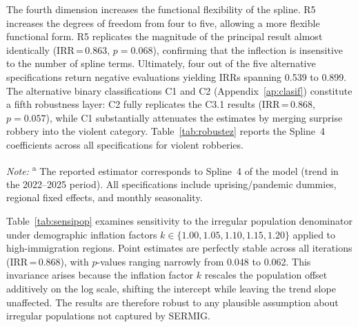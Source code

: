 \documentclass[pdflatex,sn-basic]{sn-jnl}
\newcommand{\tablenote}[1]{%
  \vspace{2pt}%
  {\par\footnotesize\textit{Note:} #1\par}%
}
\begin{document}
The fourth dimension increases the functional flexibility of the spline. R5 increases the degrees of freedom from four to five, allowing a more flexible functional form. R5 replicates the magnitude of the principal result almost identically (IRR\,=\,0.863, $p=0.068$), confirming that the inflection is insensitive to the number of spline terms. Ultimately, four out of the five alternative specifications return negative evaluations yielding IRRs spanning 0.539 to 0.899. The alternative binary classifications C1 and C2 (Appendix~\ref{ap:clasif}) constitute a fifth robustness layer: C2 fully replicates the C3.1 results (IRR\,=\,0.868, $p=0.057$), while C1 substantially attenuates the estimates by merging surprise robbery into the violent category. Table~\ref{tab:robustez} reports the Spline~4 coefficients across all specifications for violent robberies.

\begin{table}[htbp]
\centering
\caption{Robustness analysis: trend coefficient beneath alternate equivalents (violent robberies, C3.1)}
\label{tab:robustez}
\footnotesize
{}
\tablenote{\textsuperscript{a} The reported estimator corresponds to Spline~4 of the model (trend in the 2022--2025 period). All specifications include uprising/pandemic dummies, regional fixed effects, and monthly seasonality.}
\end{table}

Table~\ref{tab:sensipop} examines sensitivity to the irregular population denominator under demographic inflation factors $k \in \{1.00, 1.05, 1.10, 1.15, 1.20\}$ applied to high-immigration regions. Point estimates are perfectly stable across all iterations (IRR\,=\,0.868), with $p$-values ranging narrowly from 0.048 to 0.062. This invariance arises because the inflation factor $k$ rescales the population offset additively on the log scale, shifting the intercept while leaving the trend slope unaffected. The results are therefore robust to any plausible assumption about irregular populations not captured by SERMIG.
\end{document}
